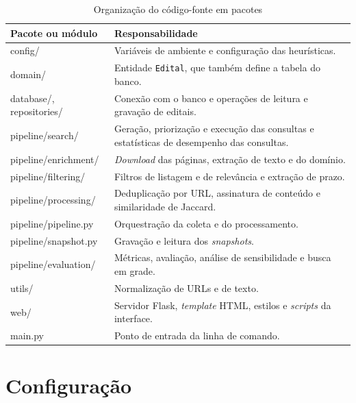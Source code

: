 \begin{table}[htbp]
\centering
\caption{Organização do código-fonte em pacotes}
\label{tab:pacotes}
\small
\begin{tabularx}{\textwidth}{>{\ttfamily}l X}
\toprule
\normalfont Pacote ou módulo & Responsabilidade \\
\midrule
config/                & Variáveis de ambiente e configuração das heurísticas. \\
domain/                & Entidade \texttt{Edital}, que também define a tabela
                         do banco. \\
database/, repositories/ & Conexão com o banco e operações de leitura e
                         gravação de editais. \\
pipeline/search/       & Geração, priorização e execução das consultas e
                         estatísticas de desempenho das consultas. \\
pipeline/enrichment/   & \textit{Download} das páginas, extração de texto e
                         do domínio. \\
pipeline/filtering/    & Filtros de listagem e de relevância e extração de
                         prazo. \\
pipeline/processing/   & Deduplicação por URL, assinatura de conteúdo e
                         similaridade de Jaccard. \\
pipeline/pipeline.py   & Orquestração da coleta e do processamento. \\
pipeline/snapshot.py   & Gravação e leitura dos \textit{snapshots}. \\
pipeline/evaluation/   & Métricas, avaliação, análise de sensibilidade e busca
                         em grade. \\
utils/                 & Normalização de URLs e de texto. \\
web/                   & Servidor Flask, \textit{template} HTML, estilos e
                         \textit{scripts} da interface. \\
main.py                & Ponto de entrada da linha de comando. \\
\bottomrule
\end{tabularx}
\end{table}

\section{Configuração}
\label{sec:impl_configuracao}

